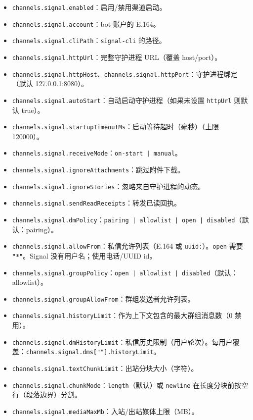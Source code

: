 \begin{itemize}
  \item \texttt{channels.signal.enabled}：启用/禁用渠道启动。
  \item \texttt{channels.signal.account}：bot 账户的 E.164。
  \item \texttt{channels.signal.cliPath}：\texttt{signal-cli} 的路径。
  \item \texttt{channels.signal.httpUrl}：完整守护进程 URL（覆盖 host/port）。
  \item \texttt{channels.signal.httpHost}、\texttt{channels.signal.httpPort}：守护进程绑定（默认 127.0.0.1:8080）。
  \item \texttt{channels.signal.autoStart}：自动启动守护进程（如果未设置 \texttt{httpUrl} 则默认 true）。
  \item \texttt{channels.signal.startupTimeoutMs}：启动等待超时（毫秒）（上限 120000）。
  \item \texttt{channels.signal.receiveMode}：\texttt{on-start | manual}。
  \item \texttt{channels.signal.ignoreAttachments}：跳过附件下载。
  \item \texttt{channels.signal.ignoreStories}：忽略来自守护进程的动态。
  \item \texttt{channels.signal.sendReadReceipts}：转发已读回执。
  \item \texttt{channels.signal.dmPolicy}：\texttt{pairing | allowlist | open | disabled}（默认：pairing）。
  \item \texttt{channels.signal.allowFrom}：私信允许列表（E.164 或 \texttt{uuid:}）。\texttt{open} 需要 \texttt{"*"}。Signal 没有用户名；使用电话/UUID id。
  \item \texttt{channels.signal.groupPolicy}：\texttt{open | allowlist | disabled}（默认：allowlist）。
  \item \texttt{channels.signal.groupAllowFrom}：群组发送者允许列表。
  \item \texttt{channels.signal.historyLimit}：作为上下文包含的最大群组消息数（0 禁用）。
  \item \texttt{channels.signal.dmHistoryLimit}：私信历史限制（用户轮次）。每用户覆盖：\texttt{channels.signal.dms[""].historyLimit}。
  \item \texttt{channels.signal.textChunkLimit}：出站分块大小（字符）。
  \item \texttt{channels.signal.chunkMode}：\texttt{length}（默认）或 \texttt{newline} 在长度分块前按空行（段落边界）分割。
  \item \texttt{channels.signal.mediaMaxMb}：入站/出站媒体上限（MB）。
\end{itemize}


